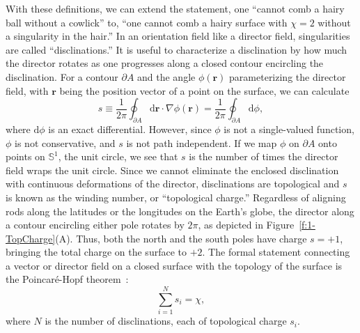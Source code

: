 With these definitions, we can extend the statement, one ``cannot comb a hairy ball without a cowlick'' to, ``one cannot comb a hairy surface with $\chi=2$ without a singularity in the hair.''
In an orientation field like a director field, singularities are called ``disclinations.''
It is useful to characterize a disclination by how much the director rotates as one progresses along a closed contour encircling the disclination.
For a contour $\partial A$ and the angle $\phi(\mathbf{r})$ parameterizing the director field, with $\mathbf{r}$ being the position vector of a point on the surface, we can calculate~\cite{RN23,RN153,RN203}
\begin{equation}
  s \equiv \frac{1}{2 \pi}\oint_{\partial A} \textrm{d}\mathbf{r} \cdot \nabla\phi(\mathbf{r}) = \frac{1}{2\pi} \oint_{\partial A} \textrm{d} \phi,\label{eq:1-topCharge}
\end{equation}
where $\textrm{d}\phi$ is an exact differential.
However, since $\phi$ is not a single-valued function, $\phi$ is not conservative, and $s$ is not path independent.
If we map $\phi$ on $\partial A$ onto points on $\mathbb{S}^1$, the unit circle, we see that $s$ is the number of times the director field wraps the unit circle.
Since we cannot eliminate the enclosed disclination with continuous deformations of the director, disclinations are topological and $s$ is known as the winding number, or ``topological charge.''
Regardless of aligning rods along the latitudes or the longitudes on the Earth's globe, the director along a contour encircling either pole rotates by $2 \pi$, as depicted in Figure~\ref{f:1-TopCharge}(A).
Thus, both the north and the south poles have charge $s = +1$, bringing the total charge on the surface to $+2$.
The formal statement connecting a vector or director field on a closed surface with the topology of the surface is the Poincar\'e-Hopf theorem~\cite{RN23}:
\begin{equation}
  \sum\limits_{i = 1}^{N} s_i = \chi,\label{e:1-PH}
\end{equation}
where $N$ is the number of disclinations, each of topological charge $s_i$.

